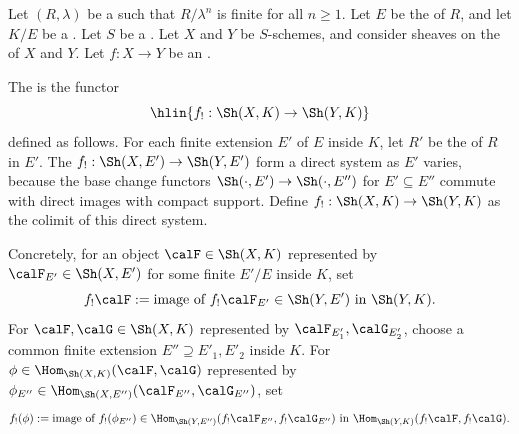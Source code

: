 \begin{definition} \label{definition:direct_image_functor_with_compact_support_on_etale_sheaves_with_algebraic_adic_coefficients_on_a_noetherian_scheme}
Let $(R, \lambda)$ be a   such that $R/\lambda^n$ is finite for all $n \geq 1$. Let $E$ be the  of $R$, and let $K/E$ be a . Let $S$ be a . Let $X$ and $Y$ be  $S$-schemes, and consider sheaves on the  of $X$ and $Y$. Let $f: X \to Y$ be an .

The  is the functor
$$\hlin{f_! : \Sh(X, K) \to \Sh(Y, K)}$$
defined as follows. For each finite extension $E'$ of $E$ inside $K$, let $R'$ be the  of $R$ in $E'$. The  $f_!: \Sh(X, E') \to \Sh(Y, E')$ form a direct system as $E'$ varies, because the base change functors $\Sh(\cdot, E') \to \Sh(\cdot, E'')$ for $E' \subseteq E''$ commute with direct images with compact support. Define $f_!: \Sh(X, K) \to \Sh(Y, K)$ as the colimit of this direct system.

Concretely, for an object $\calF \in \Sh(X, K)$ represented by $\calF_{E'} \in \Sh(X, E')$ for some finite $E'/E$ inside $K$, set
$$f_! \calF := \text{image of } f_! \calF_{E'} \in \Sh(Y, E') \text{ in } \Sh(Y, K).$$
For $\calF, \calG \in \Sh(X, K)$ represented by $\calF_{E'_1}, \calG_{E'_2}$, choose a common finite extension $E'' \supseteq E'_1, E'_2$ inside $K$. For $\phi \in \Hom_{\Sh(X, K)}(\calF, \calG)$ represented by $\phi_{E''} \in \Hom_{\Sh(X, E'')}(\calF_{E''}, \calG_{E''})$, set
$$f_! (\phi) := \text{image of } f_!(\phi_{E''}) \in \Hom_{\Sh(Y, E'')}(f_! \calF_{E''}, f_! \calG_{E''}) \text{ in } \Hom_{\Sh(Y, K)}(f_! \calF, f_! \calG).$$
\end{definition}
